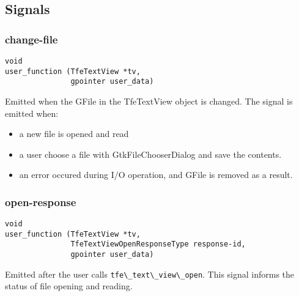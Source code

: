\hypertarget{signals-1}{%
\subsection{Signals}\label{signals-1}}

\hypertarget{change-file}{%
\subsubsection{change-file}\label{change-file}}

\begin{lstlisting}
void
user_function (TfeTextView *tv,
               gpointer user_data)
\end{lstlisting}

Emitted when the GFile in the TfeTextView object is changed. The signal
is emitted when:

\begin{itemize}
\tightlist
\item
  a new file is opened and read
\item
  a user choose a file with GtkFileChooserDialog and save the contents.
\item
  an error occured during I/O operation, and GFile is removed as a
  result.
\end{itemize}

\hypertarget{open-response}{%
\subsubsection{open-response}\label{open-response}}

\begin{lstlisting}
void
user_function (TfeTextView *tv,
               TfeTextViewOpenResponseType response-id,
               gpointer user_data)
\end{lstlisting}

Emitted after the user calls
\passthrough{\lstinline!tfe\_text\_view\_open!}. This signal informs the
status of file opening and reading.
